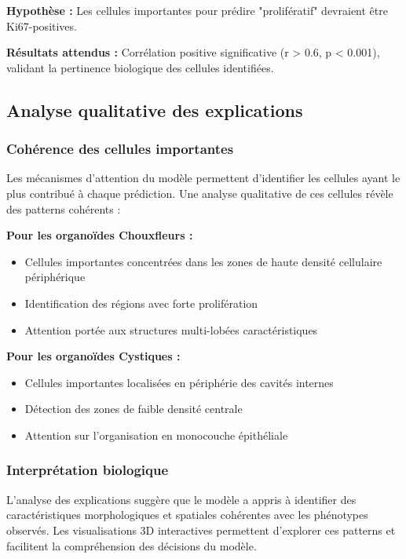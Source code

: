 \textbf{Hypothèse :}
Les cellules importantes pour prédire "prolifératif" devraient être Ki67-positives.

\textbf{Résultats attendus :}
Corrélation positive significative (r > 0.6, p < 0.001), validant la pertinence biologique des cellules identifiées.

\subsection{Analyse qualitative des explications}

\subsubsection{Cohérence des cellules importantes}

Les mécanismes d'attention du modèle permettent d'identifier les cellules ayant le plus contribué à chaque prédiction. Une analyse qualitative de ces cellules révèle des patterns cohérents :

\textbf{Pour les organoïdes Chouxfleurs :}
\begin{itemize}
    \item Cellules importantes concentrées dans les zones de haute densité cellulaire périphérique
    \item Identification des régions avec forte prolifération
    \item Attention portée aux structures multi-lobées caractéristiques
\end{itemize}

\textbf{Pour les organoïdes Cystiques :}
\begin{itemize}
    \item Cellules importantes localisées en périphérie des cavités internes
    \item Détection des zones de faible densité centrale
    \item Attention sur l'organisation en monocouche épithéliale
\end{itemize}

\subsubsection{Interprétation biologique}

L'analyse des explications suggère que le modèle a appris à identifier des caractéristiques morphologiques et spatiales cohérentes avec les phénotypes observés. Les visualisations 3D interactives permettent d'explorer ces patterns et facilitent la compréhension des décisions du modèle.

